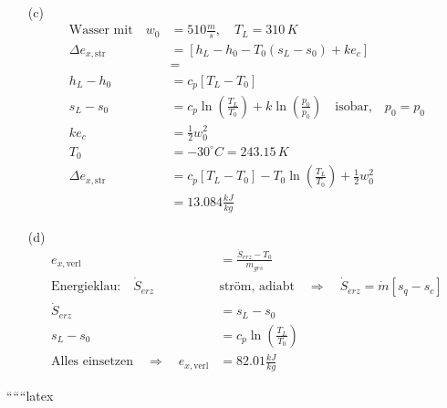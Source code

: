 \begin{itemize}
    \item[(c)] 
    \begin{align*}
        \text{Wasser mit} \quad w_0 &= 510 \frac{m}{s}, \quad T_L = 310 \, K \\
        \Delta e_{x,\text{str}} &= \left[ h_L - h_0 - T_0 (s_L - s_0) + ke_c \right] \\
        &= \\
        h_L - h_0 &= c_p [T_L - T_0] \\
        s_L - s_0 &= c_p \ln \left( \frac{T_L}{T_0} \right) + k \ln \left( \frac{p_0}{p_0} \right) \quad \text{isobar,} \quad p_0 = p_0 \\
        ke_c &= \frac{1}{2} w_0^2 \\
        T_0 &= -30^\circ C = 243.15 \, K \\
        \Delta e_{x,\text{str}} &= c_p \left[ T_L - T_0 \right] - T_0 \ln \left( \frac{T_L}{T_0} \right) + \frac{1}{2} w_0^2 \\
        &= \boxed{13.084 \frac{kJ}{kg}}
    \end{align*}
    
    \item[(d)] 
    \begin{align*}
        e_{x,\text{verl}} &= \frac{\dot{S}_{erz} - T_0}{m_{ges}} \\
        \text{Energieklau:} \quad \dot{S}_{erz} &\text{ström, adiabt} \quad \Rightarrow \quad \dot{S}_{erz} = \dot{m} [s_q - s_c] \\
        \dot{S}_{erz} &= s_L - s_0 \\
        s_L - s_0 &= c_p \ln \left( \frac{T_L}{T_0} \right) \\
        \text{Alles einsetzen} \quad \Rightarrow \quad e_{x,\text{verl}} &= \boxed{82.01 \frac{kJ}{kg}}
    \end{align*}
\end{itemize}

``````latex


